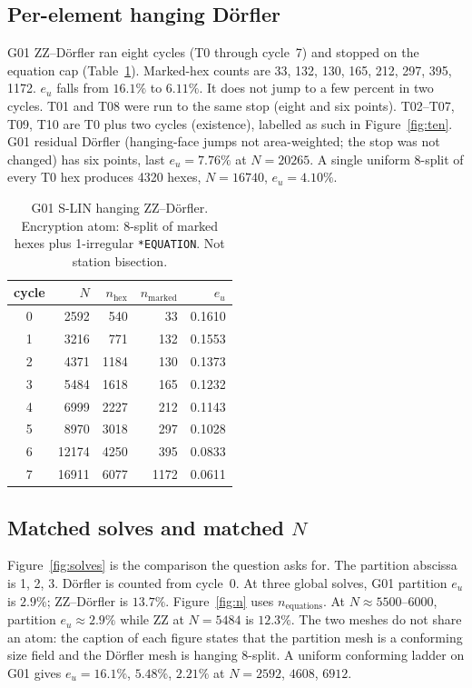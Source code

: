 \documentclass[applsci,article,submit,pdftex,oneauthor]{Definitions/mdpi}
\begin{document}
\subsection{Per-element hanging D{\"o}rfler}

G01 ZZ--D{\"o}rfler ran eight cycles (T0 through cycle~7) and stopped on the equation cap (Table~\ref{tab:zz}). Marked-hex counts are 33, 132, 130, 165, 212, 297, 395, 1172. $e_u$ falls from $16.1\%$ to $6.11\%$. It does not jump to a few percent in two cycles. T01 and T08 were run to the same stop (eight and six points). T02--T07, T09, T10 are T0 plus two cycles (existence), labelled as such in Figure~\ref{fig:ten}. G01 residual D{\"o}rfler (hanging-face jumps not area-weighted; the stop was not changed) has six points, last $e_u=7.76\%$ at $N=20265$. A single uniform 8-split of every T0 hex produces 4320 hexes, $N=16740$, $e_u=4.10\%$.

\begin{table}[H]
\caption{G01 S-LIN hanging ZZ--D{\"o}rfler. Encryption atom: 8-split of marked hexes plus 1-irregular \texttt{*EQUATION}. Not station bisection.}
\label{tab:zz}
\begin{tabular}{crrrr}
\toprule
cycle & $N$ & $n_{\mathrm{hex}}$ & $n_{\mathrm{marked}}$ & $e_u$ \\
\midrule
0 & 2592 & 540 & 33 & 0.1610 \\
1 & 3216 & 771 & 132 & 0.1553 \\
2 & 4371 & 1184 & 130 & 0.1373 \\
3 & 5484 & 1618 & 165 & 0.1232 \\
4 & 6999 & 2227 & 212 & 0.1143 \\
5 & 8970 & 3018 & 297 & 0.1028 \\
6 & 12174 & 4250 & 395 & 0.0833 \\
7 & 16911 & 6077 & 1172 & 0.0611 \\
\bottomrule
\end{tabular}
\end{table}

\subsection{Matched solves and matched $N$}

Figure~\ref{fig:solves} is the comparison the question asks for. The partition abscissa is 1, 2, 3. D{\"o}rfler is counted from cycle~0. At three global solves, G01 partition $e_u$ is $2.9\%$; ZZ--D{\"o}rfler is $13.7\%$. Figure~\ref{fig:n} uses $n_{\mathrm{equations}}$. At $N\approx 5500$--$6000$, partition $e_u\approx 2.9\%$ while ZZ at $N=5484$ is $12.3\%$. The two meshes do not share an atom: the caption of each figure states that the partition mesh is a conforming size field and the D{\"o}rfler mesh is hanging 8-split. A uniform conforming ladder on G01 gives $e_u=16.1\%$, $5.48\%$, $2.21\%$ at $N=2592$, $4608$, $6912$.
\end{document}
